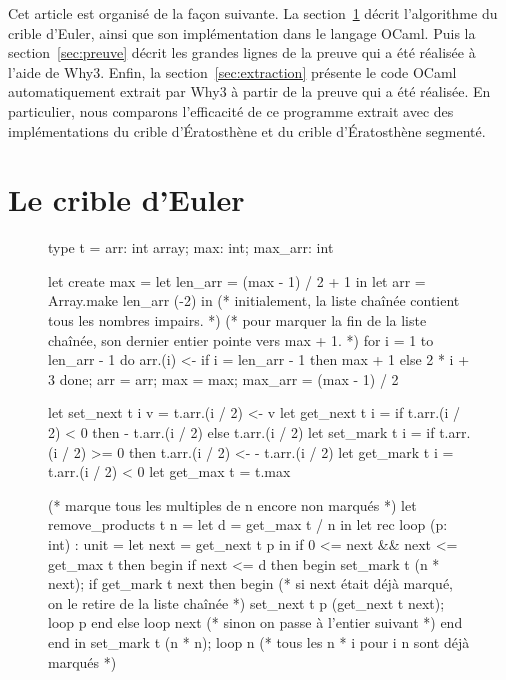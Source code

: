 \documentclass[a4paper]{easychair}
\begin{document}
Cet article est organisé de la façon suivante.
La section~\ref{sec:algo} décrit l'algorithme du crible d'Euler, ainsi que son
implémentation dans le langage OCaml.
Puis la section~\ref{sec:preuve} décrit les grandes lignes de la preuve qui a
été réalisée à l'aide de Why3.
Enfin, la section~\ref{sec:extraction} présente le code OCaml
automatiquement extrait par Why3 à partir
de la preuve qui a été réalisée. En particulier, nous comparons l'efficacité
de ce programme extrait avec des implémentations du crible d'Ératosthène et
du crible d'Ératosthène segmenté.

\section{Le crible d'Euler}
\label{sec:algo}

\begin{figure}[tp]
\begin{ocaml}
type t = { arr: int array; max: int; max_arr: int }

let create max =
  let len_arr = (max - 1) / 2 + 1 in
  let arr = Array.make len_arr (-2) in
  (* initialement, la liste chaînée contient tous les nombres impairs. *)
  (* pour marquer la fin de la liste chaînée, son dernier entier pointe vers max + 1. *)
  for i = 1 to len_arr - 1 do
    arr.(i) <- if i = len_arr - 1 then max + 1 else 2 * i + 3
  done;
  { arr = arr; max = max; max_arr = (max - 1) / 2 }

let set_next t i v = t.arr.(i / 2) <- v
let get_next t i = if t.arr.(i / 2) < 0 then - t.arr.(i / 2) else t.arr.(i / 2)
let set_mark t i = if t.arr.(i / 2) >= 0 then t.arr.(i / 2) <- - t.arr.(i / 2)
let get_mark t i = t.arr.(i / 2) < 0
let get_max t = t.max

(* marque tous les multiples de n encore non marqués *)
let remove_products t n =
  let d = get_max t / n in
  let rec loop (p: int) : unit =
    let next = get_next t p in
    if 0 <= next && next <= get_max t then begin
      if next <= d then begin
        set_mark t (n * next);
        if get_mark t next then begin
          (* si next était déjà marqué, on le retire de la liste chaînée *)
          set_next t p (get_next t next); loop p
        end else loop next (* sinon on passe à l'entier suivant *)
      end end in
  set_mark t (n * n); loop n (* tous les n * i pour i \< n sont déjà marqués *)


\end{ocaml}
\end{figure}
\end{document}
